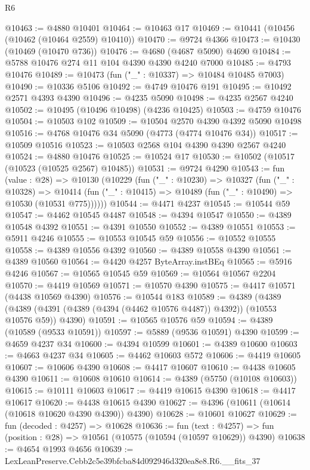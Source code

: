 \begin{lexlean}{R6}
\begin{coremodule}
@10463 := @4880 @10401
@10464 := @10463 @17
@10469 := @10441 (@10456 (@10462 (@10464 @2559) @10410))
@10470 := @9724 @4366
@10473 := @10430 (@10469 (@10470 @736))
@10476 := @4680 (@4687 @5090) @4690
@10484 := @5788 @10476 @274 @11 @104 @4390 @4390 @4240 @7000
@10485 := @4793 @10476
@10489 := @10473 (fun ("_" : @10337) => @10484 @10485 @7003)
@10490 := @10336 @5106
@10492 := @4749 @10476 @191
@10495 := @10492 @2571 @4393 @4390
@10496 := @4235 @5090
@10498 := @4235 @2567 @4240
@10502 := @10495 (@10496 @10498) (@4236 @10425)
@10503 := @4759 @10476
@10504 := @10503 @102
@10509 := @10504 @2570 @4390 @4392 @5090 @10498
@10516 := @4768 @10476 @34 @5090 (@4773 (@4774 @10476 @34))
@10517 := @10509 @10516
@10523 := @10503 @2568 @104 @4390 @4390 @2567 @4240
@10524 := @4880 @10476
@10525 := @10524 @17
@10530 := @10502 (@10517 (@10523 (@10525 @2567) @10485))
@10531 := @9724 @4290
@10543 := fun (value : @28) =>
  @10130
    (@10229
      (fun ("_" : @10230) =>
      @10327
        (fun ("_" : @10328) =>
        @10414 (fun ("_" : @10415) => @10489 (fun ("_" : @10490) => @10530 (@10531 @775))))))
@10544 := @4471 @4237
@10545 := @10544 @59
@10547 := @4462 @10545 @4487
@10548 := @4394 @10547
@10550 := @4389 @10548 @4392
@10551 := @4391 @10550
@10552 := @4389 @10551
@10553 := @5911 @4246
@10555 := @10553 @10545 @59
@10556 := @10552 @10555
@10558 := @4389 @10556 @4392
@10560 := @4389 @10558 @4390
@10561 := @4389 @10560
@10564 := @4420 @4257 ByteArray.instBEq
@10565 := @5916 @4246
@10567 := @10565 @10545 @59
@10569 := @10564 @10567 @2204
@10570 := @4419 @10569
@10571 := @10570 @4390
@10575 := @4417 @10571 (@4438 @10569 @4390)
@10576 := @10544 @183
@10589 := @4389
    (@4389 (@4389 (@4391 (@4389 (@4394 (@4462 @10576 @4487)) @4392)) (@10553 @10576 @59)) @4390)
@10591 := @10565 @10576 @59
@10594 := @4389 (@10589 (@9533 @10591))
@10597 := @5889 (@9536 @10591) @4390
@10599 := @4659 @4237 @34
@10600 := @4394 @10599
@10601 := @4389 @10600
@10603 := @4663 @4237 @34
@10605 := @4462 @10603 @572
@10606 := @4419 @10605
@10607 := @10606 @4390
@10608 := @4417 @10607
@10610 := @4438 @10605 @4390
@10611 := @10608 @10610
@10614 := @4389 (@5750 (@10108 @10603))
@10615 := @10111 @10603
@10617 := @4419 @10615 @4390
@10618 := @4417 @10617
@10620 := @4438 @10615 @4390
@10627 := @4396 (@10611 (@10614 (@10618 @10620 @4390 @4390)) @4390)
@10628 := @10601 @10627
@10629 := fun (decoded : @4257) => @10628
@10636 := fun (text : @4257) =>
  fun (position : @28) => @10561 (@10575 (@10594 (@10597 @10629)) @4390)
@10638 := @4654 @1993 @4656
@10639 := LexLeanPreserve.Cebb2c5e39bfcba84d092946d320ea8e8.R6.__fits_37

\end{coremodule}
\end{lexlean}
